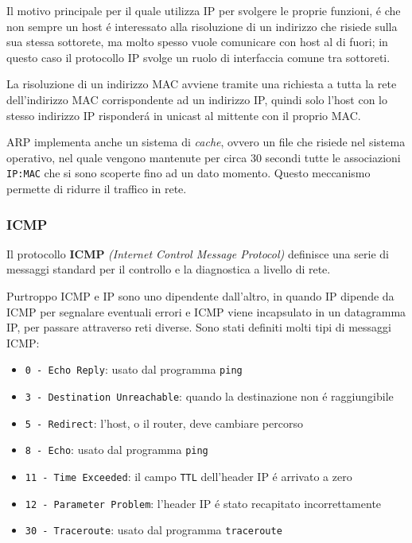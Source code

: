 \documentclass[12pt]{article}
\def\code#1{\texttt{#1}}
\begin{document}
Il motivo principale per il quale utilizza IP per svolgere le proprie funzioni, \'e che non sempre un host \'e 
interessato alla risoluzione di un indirizzo che risiede sulla sua stessa sottorete, ma molto spesso vuole comunicare con 
host al di fuori; in questo caso il protocollo IP svolge un ruolo di interfaccia comune tra sottoreti.

La risoluzione di un indirizzo MAC avviene tramite una richiesta a tutta la rete dell'indirizzo MAC corrispondente ad un 
indirizzo IP, quindi solo l'host con lo stesso indirizzo IP risponder\'a in unicast al mittente con il proprio MAC.

ARP implementa anche un sistema di \textit{cache}, ovvero un file che risiede nel sistema operativo, nel quale vengono 
mantenute per circa 30 secondi tutte le associazioni \code{IP:MAC} che si sono scoperte fino ad un dato momento. Questo 
meccanismo permette di ridurre il traffico in rete.

\subsubsection{ICMP}\label{spazio-indirizzamento-in-ip-icmp}
Il protocollo \textbf{ICMP} \textit{(Internet Control Message Protocol)} definisce una serie di messaggi standard per il 
controllo e la diagnostica a livello di rete.

Purtroppo ICMP e IP sono uno dipendente dall'altro, in quando IP dipende da ICMP per segnalare eventuali errori e
ICMP viene incapsulato in un datagramma IP, per passare attraverso reti diverse. Sono stati definiti molti tipi di 
messaggi ICMP:
\begin{itemize}[noitemsep]
	\item \code{0 - Echo Reply}: usato dal programma \code{ping}
	\item \code{3 - Destination Unreachable}: quando la destinazione non \'e raggiungibile
	\item \code{5 - Redirect}: l'host, o il router, deve cambiare percorso
	\item \code{8 - Echo}: usato dal programma \code{ping}
	\item \code{11 - Time Exceeded}: il campo \code{TTL} dell'header IP \'e arrivato a zero
	\item \code{12 - Parameter Problem}: l'header IP \'e stato recapitato incorrettamente
	\item \code{30 - Traceroute}:  usato dal programma \code{traceroute}
\end{itemize}
\end{document}
